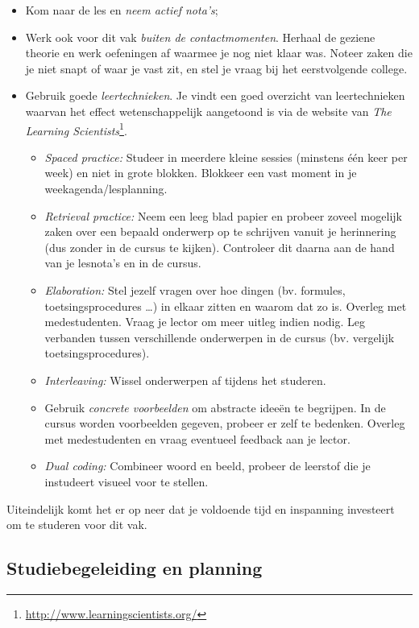 \begin{itemize}
  \item Kom naar de les en \emph{neem actief nota's}\parencite{Lundin2020};
  \item Werk ook voor dit vak \emph{buiten de contactmomenten}. Herhaal de geziene theorie en werk oefeningen af waarmee je nog niet klaar was. Noteer zaken die je niet snapt of waar je vast zit, en stel je vraag bij het eerstvolgende college.
  \item Gebruik goede \emph{leertechnieken}. Je vindt een goed overzicht van leertechnieken waarvan het effect wetenschappelijk aangetoond is via de website van \emph{The Learning Scientists}\footnote{\url{http://www.learningscientists.org/}}.
  \begin{itemize}
    \item \emph{Spaced practice:} Studeer in meerdere kleine sessies (minstens één keer per week) en niet in grote blokken. Blokkeer een vast moment in je weekagenda/lesplanning.
    \item \emph{Retrieval practice:} Neem een leeg blad papier en probeer zoveel mogelijk zaken over een bepaald onderwerp op te schrijven vanuit je herinnering (dus zonder in de cursus te kijken). Controleer dit daarna aan de hand van je lesnota's en in de cursus.
    \item \emph{Elaboration:} Stel jezelf vragen over hoe dingen (bv. formules, toetsingsprocedures \ldots) in elkaar zitten en waarom dat zo is. Overleg met medestudenten. Vraag je lector om meer uitleg indien nodig. Leg verbanden tussen verschillende onderwerpen in de cursus (bv. vergelijk toetsingsprocedures).
    \item \emph{Interleaving:} Wissel onderwerpen af tijdens het studeren.
    \item Gebruik \emph{concrete voorbeelden} om abstracte ideeën te begrijpen. In de cursus worden voorbeelden gegeven, probeer er zelf te bedenken. Overleg met medestudenten en vraag eventueel feedback aan je lector.
    \item \emph{Dual coding:} Combineer woord en beeld, probeer de leerstof die je instudeert visueel voor te stellen.
  \end{itemize}
\end{itemize}

Uiteindelijk komt het er op neer dat je voldoende tijd en inspanning investeert om te studeren voor dit vak.

\subsection{Studiebegeleiding en planning}

